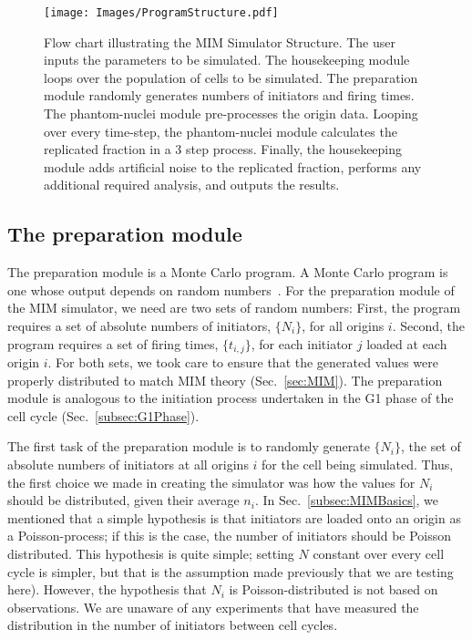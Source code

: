	\begin{SCfigure}[1][tbh]
		\texttt{[image: Images/ProgramStructure.pdf]}
		\caption[MIM Simulator Program Structure]{\label{fig:ProgramStructure} 
			Flow chart illustrating the MIM Simulator Structure.
			The user inputs the parameters to be simulated.
			The housekeeping module loops over the population of cells to be simulated.
			The preparation module randomly generates numbers of initiators and firing times.
			The phantom-nuclei module pre-processes the origin data.
			Looping over every time-step, the phantom-nuclei module calculates the replicated fraction in a 3 step process.
			Finally, the housekeeping module adds artificial noise to the replicated fraction, performs any additional required analysis, and outputs the results.
		}
	\end{SCfigure}
	
	
		\subsection{The preparation module}
		\label{subsec:PrepModule}
		
		The preparation module is a Monte Carlo program.
		A Monte Carlo program is one whose output depends on random numbers~\cite{CompPhys}.
		For the preparation module of the MIM simulator,  we need are two sets of random numbers:
		First, the program requires a set of absolute numbers of initiators, $\{N_i\}$, for all origins $i$.
		Second, the program requires a set of firing times, $\{t_{i,j}\}$, for each initiator $j$ loaded at each origin $i$.
		For both sets, we took care to ensure that the generated values were properly distributed to match MIM theory (Sec.~\ref{sec:MIM}).
		The preparation module is analogous to the initiation process undertaken in the G1 phase of the cell cycle (Sec.~\ref{subsec:G1Phase}).
			
		The first task of the preparation module is to randomly generate $\{N_i\}$, the set of absolute numbers of initiators at all origins $i$ for the cell being simulated.
		Thus, the first choice we made in creating the simulator was how the values for $N_i$ should be distributed, given their average $n_i$.
		In Sec.~\ref{subsec:MIMBasics}, we mentioned that a simple hypothesis is that initiators are loaded onto an origin as a Poisson-process; if this is the case, the number of initiators should be Poisson distributed.
		This hypothesis is quite simple; setting $N$ constant over every cell cycle is simpler, but that is the assumption made previously that we are testing here).
		However, the hypothesis that $N_i$ is Poisson-distributed is not based on observations.
		We are unaware of any experiments that have measured the distribution in the number of initiators between cell cycles.
		
